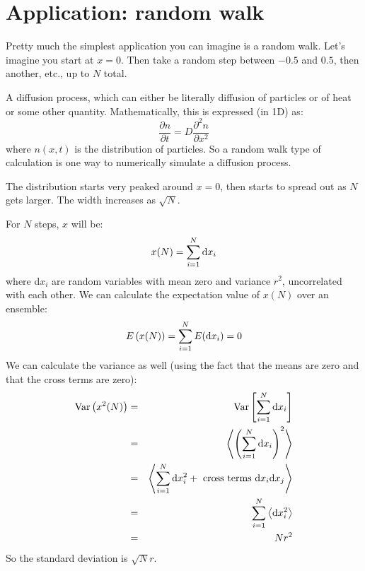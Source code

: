 \section{Application: random walk}

Pretty much the simplest application you can imagine is a random
walk. Let's imagine you start at $x=0$. Then take a random step
between $-0.5$ and $0.5$, then another, etc., up to $N$ total.


\begin{answer}
  A diffusion process, which can either be literally diffusion of
  particles or of heat or some other quantity. Mathematically, this is
  expressed (in 1D) as:
  \begin{equation}
    \frac{\partial n}{\partial t} = D \frac{\partial^2 n}{\partial
      x^2}
  \end{equation}
   where $n(x, t)$ is the distribution of particles. So a random walk
   type of calculation is one way to numerically simulate a diffusion
   process. 
\end{answer}


\begin{answer}
The distribution starts very peaked around $x=0$, then starts to
spread out as $N$ gets larger. The width increases as $\sqrt{N}$.
\end{answer}


\begin{answer}
  For $N$ steps, $x$ will be:
  \begin{equation}
    x(N) = \sum_{i=1}^{N} {\rm d}x_i
  \end{equation}
  where d$x_i$ are random variables with mean zero and variance $r^2$,
  uncorrelated with each other. We can calculate the expectation value
  of $x(N)$ over an ensemble:
  \begin{equation}
    E\left(x(N)\right) = \sum_{i=1}^{N} E({\rm d}x_i) = 0
  \end{equation}
  We can calculate the variance as well (using the fact that the means
  are zero and that the cross terms are zero):
  \begin{eqnarray}
    {\rm Var}\left(x^2(N)\right)
    &=& {\rm Var}\left[\sum_{i=1}^{N} {\rm d}x_i\right] \cr
    &=& \left\langle\left(\sum_{i=1}^{N} {\rm
      d}x_i\right)^2\right\rangle \cr
    &=& \left\langle\sum_{i=1}^{N} {\rm d}x_i^2 + {\rm
        ~cross~terms~d}x_i{\rm d}x_j \right\rangle \cr
    &=& \sum_{i=1}^{N} \left\langle {\rm d}x_i^2 \right\rangle \cr
    &=& N r^2
  \end{eqnarray}
  So the standard deviation is $\sqrt{N} r$.
\end{answer}

